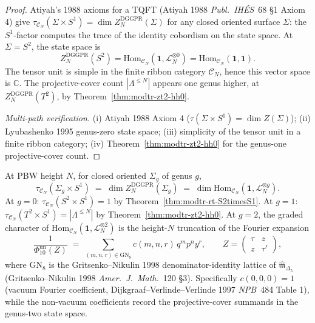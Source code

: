 \begin{proof}
Atiyah's 1988 axioms for a TQFT
(Atiyah 1988 \emph{Publ.~IH\'ES}~68 \S 1 Axiom 4) give
$\tau_{\mathcal C_N}(\Sigma\times S^1) = \dim Z_N^{\mathrm{DGGPR}}(\Sigma)$
for any closed oriented surface $\Sigma$: the $S^1$-factor computes
the trace of the identity cobordism on the state space. At
$\Sigma = S^2$, the state space is
\[
 Z_N^{\mathrm{DGGPR}}(S^2)
 =
 \mathrm{Hom}_{\mathcal C_N}(\mathbf 1,\mathcal L_N^{\otimes 0})
 =
 \mathrm{Hom}_{\mathcal C_N}(\mathbf 1,\mathbf 1).
\]
The tensor unit is simple in the finite ribbon category
\(\mathcal C_N\), hence this vector space is \(\mathbb C\). The
projective-cover count \(|\Lambda^{\leq N}|\) appears one genus higher,
at \(Z_N^{\mathrm{DGGPR}}(T^2)\), by
Theorem~\ref{thm:modtr-zt2-hh0}.

\emph{Multi-path verification.}
(i) Atiyah 1988 Axiom 4 ($\tau(\Sigma\times S^1) = \dim Z(\Sigma)$);
(ii) Lyubashenko 1995 genus-zero state space;
(iii) simplicity of the tensor unit in a finite ribbon category;
(iv) Theorem~\ref{thm:modtr-zt2-hh0} for the genus-one projective-cover count.
\end{proof}

\begin{theorem}
\label{thm:modtr-rt-SigmagS1}
At PBW height \(N\), for closed oriented $\Sigma_g$ of genus $g$,
\[
 \tau_{\mathcal C_N}(\Sigma_g\times S^1)
 \;=\;
 \dim Z_N^{\mathrm{DGGPR}}(\Sigma_g)
 \;=\;
 \dim\mathrm{Hom}_{\mathcal C_N}(\mathbf 1, \mathcal L_N^{\otimes g}).
\]
At \(g=0\): \(\tau_{\mathcal C_N}(S^2\times S^1)=1\) by
Theorem~\ref{thm:modtr-rt-S2timesS1}. At $g = 1$:
\(\tau_{\mathcal C_N}(T^2\times S^1) = |\Lambda^{\leq N}|\)
by Theorem~\ref{thm:modtr-zt2-hh0}.
At $g = 2$, the graded character of
\(\mathrm{Hom}_{\mathcal C_N}(\mathbf 1,\mathcal L_N^{\otimes 2})\)
is the height-\(N\) truncation of the Fourier expansion
\[
 \frac{1}{\Phi_{10}^{\mathrm{un}}(Z)}
 \;=\;
 \sum_{(m,n,r)\in\mathrm{GN}_8}
 c(m, n, r)\,q^m p^n y^r,
 \qquad
 Z = \begin{pmatrix}\tau & z\\ z & \tau'\end{pmatrix},
\]
where $\mathrm{GN}_8$ is the Gritsenko--Nikulin 1998
denominator-identity lattice of
$\widehat{\mathfrak m}_{\Delta_5}$ (Gritsenko--Nikulin 1998
\emph{Amer.~J.~Math.}~120 \S 3). Specifically $c(0,0,0) = 1$
(vacuum Fourier coefficient, Dijkgraaf--Verlinde--Verlinde 1997
\emph{NPB}~484 Table 1), while the non-vacuum coefficients record the
projective-cover summands in the genus-two state space.
\end{theorem}

